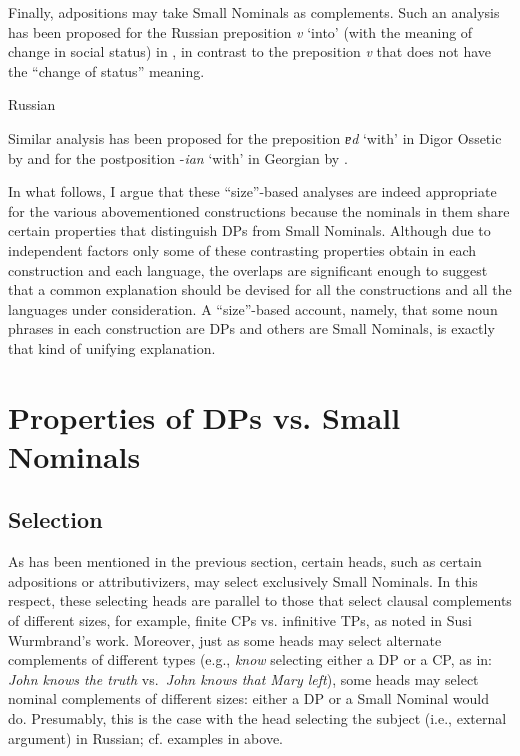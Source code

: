 \documentclass[output=paper]{langsci/langscibook}
\begin{document}
Finally, adpositions may take Small Nominals as complements. 
Such an analysis has been proposed for the Russian preposition \textit{v} ‘into’ (with the meaning of change in social status) in \citet{MitreninaPereltsvaig2019}, 
in contrast to the preposition \textit{v} that does not have the “change of status” meaning.

\ea%
    \label{pereex:6}
    Russian 
    \z 
\z 

Similar analysis has been proposed for the preposition \textit{ɐd} ‘with’ in Digor Ossetic by \citet{Erschler2019b,Erschler2019a} 
and for the postposition -\textit{ian} ‘with’ in Georgian by \citet{Erschler2019b}.

In what follows, I argue that these “size”-based analyses are indeed appropriate for the various abovementioned constructions 
because the nominals in them share certain properties that distinguish DPs from Small Nominals. 
Although due to independent factors only some of these contrasting properties obtain in each construction and each language, 
the overlaps are significant enough to suggest that a common explanation should be devised for all the constructions and all the languages under consideration. 
A “size”-based account, namely, that some noun phrases in each construction are DPs and others are Small Nominals, is exactly that kind of unifying explanation.

\section{Properties of DPs vs. Small Nominals}\largerpage
\label{peresec:3}

\subsection{Selection} %

As has been mentioned in the previous section, certain heads, such as certain adpositions or attributivizers, may select exclusively Small Nominals. 
In this respect, these selecting heads are parallel to those that select clausal complements of different sizes, for example, finite CPs vs. infinitive TPs, 
as noted in Susi Wurmbrand’s work. Moreover, just as some heads may select alternate complements of different types 
(e.g., \textit{know} selecting either a DP or a CP, as in: \textit{John knows the truth} vs.~\textit{John knows that Mary left}), 
some heads may select nominal complements of different sizes: 
either a DP or a Small Nominal would do. 
Presumably, this is the case with the head selecting the subject (i.e., external argument) in Russian; 
cf. examples in  above.
\end{document}
